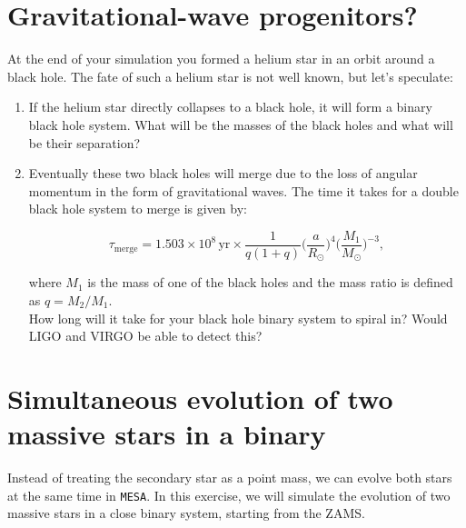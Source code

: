 \documentclass[11pt,a4paper]{article}
\begin{document}
\section{Gravitational-wave progenitors?}

At the end of your simulation you formed a helium star in an orbit around a black hole. The fate of such a helium star is not well known, but let's speculate:

\begin{enumerate}[label=(\alph*)]
  \item If the helium star directly collapses to a black hole, it will form a binary black hole system. What will be the masses of the black holes and what will be their separation?

  \item Eventually these two black holes will merge due to the loss of angular momentum in the form of gravitational waves. The time it takes for a double black hole system to merge is given by:
  
  \begin{equation*}
  \tau_{\mathrm{merge}} = 1.503 \times 10^8\,\mathrm{yr} \times \frac{1}{q(1+q)}\bigg(\frac{a}{R_\odot}\bigg)^4\bigg(\frac{M_1}{M_\odot}\bigg)^{-3},
  \end{equation*}
  
  where $M_1$ is the mass of one of the black holes and the mass ratio is defined as $q=M_2/M_1$.\\[1ex]
  How long will it take for your black hole binary system to spiral in? Would LIGO and VIRGO be able to detect this?

\end{enumerate}


\section{Simultaneous evolution of two massive stars in a binary}

Instead of treating the secondary star as a point mass, we can evolve both stars at the same time in \texttt{MESA}. In this exercise, we will simulate the evolution of two massive stars in a close binary system, starting from the ZAMS.
\end{document}
